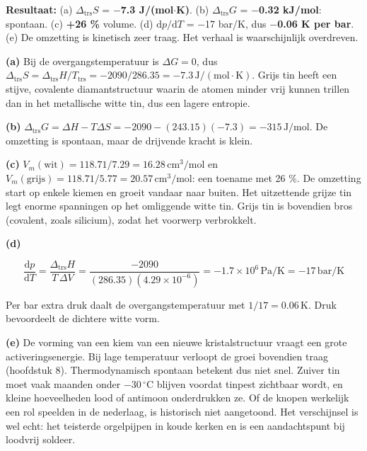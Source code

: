 \begin{oplossing}
\textbf{Resultaat:} (a) \(\Delta_{\text{trs}}S\) = \textbf{\ensuremath{-}7.3 J/(mol\ensuremath{\cdot{}}K)}. (b) \(\Delta_{\text{trs}}G\) = \textbf{\ensuremath{-}0.32 kJ/mol}: spontaan. (c) \textbf{+26 \%} volume. (d) \(\mathrm{d}p/\mathrm{d}T\) = \ensuremath{-}17 bar/K, dus \textbf{\ensuremath{-}0.06 K per bar}. (e) De omzetting is kinetisch zeer traag. Het verhaal is waarschijnlijk overdreven.

\textbf{(a)} Bij de overgangstemperatuur is \(\Delta G = 0\), dus \(\Delta_{\text{trs}}S = \Delta_{\text{trs}}H/T_{\text{trs}} = -2090/286.35 = -7.3\,\mathrm{J/(mol\cdot K)}\). Grijs tin heeft een stijve, covalente diamantstructuur waarin de atomen minder vrij kunnen trillen dan in het metallische witte tin, dus een lagere entropie.

\textbf{(b)} \(\Delta_{\text{trs}}G = \Delta H - T\Delta S = -2090 - (243.15)(-7.3) = -315\,\mathrm{J/mol}\). De omzetting is spontaan, maar de drijvende kracht is klein.

\textbf{(c)} \(V_m(\text{wit}) = 118.71/7.29 = 16.28\,\mathrm{cm^3/mol}\) en \(V_m(\text{grijs}) = 118.71/5.77 = 20.57\,\mathrm{cm^3/mol}\): een toename met 26 \%. De omzetting start op enkele kiemen en groeit vandaar naar buiten. Het uitzettende grijze tin legt enorme spanningen op het omliggende witte tin. Grijs tin is bovendien bros (covalent, zoals silicium), zodat het voorwerp verbrokkelt.

\textbf{(d)}

\[
\frac{\mathrm{d}p}{\mathrm{d}T} = \frac{\Delta_{\text{trs}}H}{T\,\Delta V} = \frac{-2090}{(286.35)(4.29\times10^{-6})} = -1.7\times10^{6}\,\mathrm{Pa/K} = -17\,\mathrm{bar/K}
\]

Per bar extra druk daalt de overgangstemperatuur met \(1/17 = 0.06\,\mathrm{K}\). Druk bevoordeelt de dichtere witte vorm.

\textbf{(e)} De vorming van een kiem van een nieuwe kristalstructuur vraagt een grote activeringsenergie. Bij lage temperatuur verloopt de groei bovendien traag (hoofdstuk 8). Thermodynamisch spontaan betekent dus niet snel. Zuiver tin moet vaak maanden onder \(-30\,^\circ\mathrm{C}\) blijven voordat tinpest zichtbaar wordt, en kleine hoeveelheden lood of antimoon onderdrukken ze. Of de knopen werkelijk een rol speelden in de nederlaag, is historisch niet aangetoond. Het verschijnsel is wel echt: het teisterde orgelpijpen in koude kerken en is een aandachtspunt bij loodvrij soldeer.
\end{oplossing}

